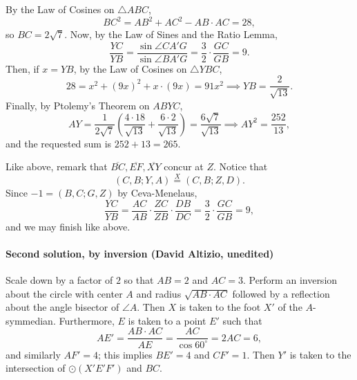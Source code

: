     By the Law of Cosines on $\triangle ABC$, \[BC^2=AB^2+AC^2-AB\cdot AC=28,\]
    so $BC=2\sqrt7$. Now, by the Law of Sines and the Ratio Lemma, \[\frac{YC}{YB}=\frac{\sin\angle CA'G}{\sin\angle BA'G}=\frac32\cdot\frac{GC}{GB}=9.\]
    Then, if $x=YB$, by the Law of Cosines on $\triangle YBC$, \[28=x^2+(9x)^2+x\cdot(9x)=91x^2\implies YB=\frac2{\sqrt{13}}.\]
    Finally, by Ptolemy's Theorem on $ABYC$, \[AY=\frac1{2\sqrt7}\left(\frac{4\cdot 18}{\sqrt{13}}+\frac{6\cdot 2}{\sqrt{13}}\right)=\frac{6\sqrt{7}}{\sqrt{13}}\implies AY^2=\frac{252}{13},\]
    and the requested sum is $252+13=265$.
    \begin{remark}
        Like above, remark that $\overline{BC},\overline{EF},\overline{XY}$ concur at $Z$. Notice that \[(C,B;Y,A)\stackrel{X}{=}(C,B;Z,D).\]
        Since $-1=(B,C;G,Z)$ by Ceva-Menelaus, \[\frac{YC}{YB}=\frac{AC}{AB}\cdot\frac{ZC}{ZB}\cdot\frac{DB}{DC}=\frac32\cdot\frac{GC}{GB}=9,\]
        and we may finish like above.
    \end{remark}

\paragraph{Second solution, by inversion (David Altizio, unedited)}     Scale down by a factor of $2$ so that $AB = 2$ and $AC = 3$. Perform an inversion about the circle with center $A$ and radius $\sqrt{AB\cdot AC}$ followed by a reflection about the angle bisector of $\angle A$. Then $X$ is taken to the foot $X'$ of the $A$-symmedian. Furthermore, $E$ is taken to a point $E'$ such that
    \[
        AE' = \frac{AB\cdot AC}{AE} = \frac{AC}{\cos 60^\circ} = 2AC = 6,
    \]and similarly $AF' = 4$; this implies $BE' = 4$ and $CF' = 1$. Then $Y'$ is taken to the intersection of $\odot(X'E'F')$ and $BC$.

